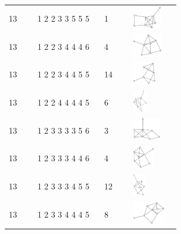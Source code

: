 \begin{table}[h!]
\begin{tabular}{m{0.15\linewidth} m{0.35\linewidth} m{0.15\linewidth} m{0.25\linewidth}}
13 & 1 2 2 3 3 5 5 5 & 1 & \includegraphics[height=1cm]{15-universal-graphs/img/degree-sequences-example-graphs/graph-4-8-39}\\
13 & 1 2 2 3 4 4 4 6 & 4 & \includegraphics[height=1cm]{15-universal-graphs/img/degree-sequences-example-graphs/graph-4-8-40}\\
13 & 1 2 2 3 4 4 5 5 & 14 & \includegraphics[height=1cm]{15-universal-graphs/img/degree-sequences-example-graphs/graph-4-8-41}\\
13 & 1 2 2 4 4 4 4 5 & 6 & \includegraphics[height=1cm]{15-universal-graphs/img/degree-sequences-example-graphs/graph-4-8-42}\\
13 & 1 2 3 3 3 3 5 6 & 3 & \includegraphics[height=1cm]{15-universal-graphs/img/degree-sequences-example-graphs/graph-4-8-43}\\
13 & 1 2 3 3 3 4 4 6 & 4 & \includegraphics[height=1cm]{15-universal-graphs/img/degree-sequences-example-graphs/graph-4-8-44}\\
13 & 1 2 3 3 3 4 5 5 & 12 & \includegraphics[height=1cm]{15-universal-graphs/img/degree-sequences-example-graphs/graph-4-8-45}\\
13 & 1 2 3 3 4 4 4 5 & 8 & \includegraphics[height=1cm]{15-universal-graphs/img/degree-sequences-example-graphs/graph-4-8-46}\\

\end{tabular}
\end{table}
